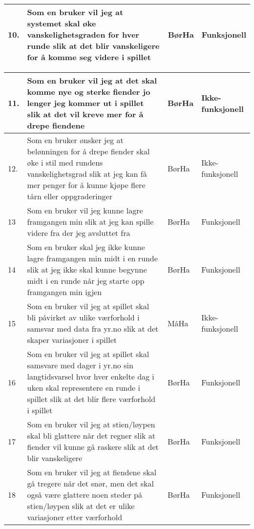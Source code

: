 \documentclass[norsk,a4paper]{article}
\begin{document}
\begin{center}
\begin{tabular}{ | m{0.4cm} | m{6.1cm} | m{2cm} | m{3cm} | }
    10. & Som en bruker vil jeg at systemet skal øke vanskelighetsgraden for hver runde slik at det blir vanskeligere for å komme seg videre i spillet & BørHa & Funksjonell \\ \hline
   
    
    
\end{tabular}

\begin{tabular}{|m{} | m{} | m{2cm} | m{3cm} |}
    \hline   
    
   	   11. & Som en bruker vil jeg at det skal komme nye og sterke fiender jo lenger jeg kommer ut i spillet slik at det vil kreve mer for å drepe fiendene & BørHa & Ikke-funksjonell
    \\ \hline
     
    12. & Som en bruker ønsker jeg at belønningen for å drepe fiender skal øke i stil med rundens vanskelighetsgrad slik at jeg kan få mer penger for å kunne kjøpe flere tårn eller oppgraderinger & BørHa & Ikke-funksjonell \\
    \hline
    
    13 & Som en bruker vil jeg kunne lagre framgangen min slik at jeg kan spille videre fra der jeg avsluttet fra & BørHa & Funksjonell \\ \hline
      
    14 & Som en bruker skal jeg ikke kunne lagre framgangen min midt i en runde slik at jeg ikke skal kunne begynne midt i en runde når jeg starte opp framgangen min igjen  & BørHa & Funksjonell \\ \hline
   
    15 & Som en bruker vil jeg at spillet skal bli påvirket av ulike værforhold i samsvar med data fra yr.no slik at det skaper variasjoner i spillet  & MåHa & Ikke-funksjonell \\ \hline
    
    16 & Som en bruker vil jeg at spillet skal samsvare med dager i yr.no sin langtidsvarsel hvor hver enkelte dag i uken skal representere en runde i spillet slik at det blir flere værforhold i spillet & BørHa & Funksjonell \\ \hline
    
    17 & Som en bruker vil jeg at stien/løypen skal bli glattere når det regner slik at fiender vil kunne gå raskere slik at det blir vanskeligere & BørHa & Funksjonell \\ \hline
    
    18 & Som en bruker vil jeg at fiendene skal gå tregere når det snør, men det skal også være glattere noen steder på stien/løypen slik at det er ulike variasjoner etter værforhold & BørHa & Funksjonell \\ \hline
    

\end{tabular}
\end{center}
\end{document}
